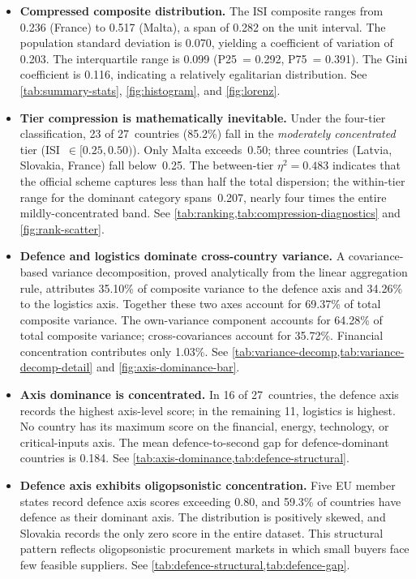 \begin{itemize}[leftmargin=2em]

\item \textbf{Compressed composite distribution.}
  The ISI composite ranges from 0.236 (France) to
  0.517 (Malta), a span of 0.282 on the unit
  interval.  The population standard deviation is 0.070,
  yielding a coefficient of variation of 0.203.  The interquartile
  range is 0.099 (P25~= 0.292, P75~= 0.391).
  The Gini coefficient is 0.116,
  indicating a relatively egalitarian distribution.
  See \cref{tab:summary-stats}, \cref{fig:histogram}, and
  \cref{fig:lorenz}.

\item \textbf{Tier compression is mathematically inevitable.}
  Under the four-tier classification, 23 of 27~countries (85.2\%)
  fall in the \emph{moderately concentrated} tier
  (ISI~$\in [0.25, 0.50)$).  Only Malta exceeds~0.50; three countries
  (Latvia, Slovakia, France) fall below~0.25.  The between-tier
  $\eta^2 = 0.483$ indicates that the official scheme captures less
  than half the total dispersion; the within-tier range for the
  dominant category spans~0.207, nearly four times the entire
  mildly-concentrated band.
  See \cref{tab:ranking,tab:compression-diagnostics} and \cref{fig:rank-scatter}.

\item \textbf{Defence and logistics dominate cross-country variance.}
  A covariance-based variance decomposition, proved analytically from
  the linear aggregation rule, attributes 35.10\% of composite
  variance to the defence axis and 34.26\% to the logistics axis.
  Together these two axes account for 69.37\% of total composite
  variance.  The own-variance component accounts for 64.28\% of total
  composite variance; cross-covariances account for 35.72\%.
  Financial concentration contributes only 1.03\%.
  See \cref{tab:variance-decomp,tab:variance-decomp-detail} and
  \cref{fig:axis-dominance-bar}.

\item \textbf{Axis dominance is concentrated.}
  In 16 of 27~countries, the defence axis records the highest
  axis-level score; in the remaining 11, logistics is highest.
  No country has its maximum score on the financial, energy,
  technology, or critical-inputs axis.  The mean defence-to-second
  gap for defence-dominant countries is 0.184.
  See \cref{tab:axis-dominance,tab:defence-structural}.

\item \textbf{Defence axis exhibits oligopsonistic concentration.}
  Five EU member states record defence axis scores exceeding 0.80,
  and 59.3\% of countries have defence as their dominant axis.  The
  distribution is positively skewed, and Slovakia records the only
  zero score in the entire dataset.  This structural pattern reflects
  oligopsonistic procurement markets in which small
  buyers face few feasible suppliers.
  See \cref{tab:defence-structural,tab:defence-gap}.


\end{itemize}
